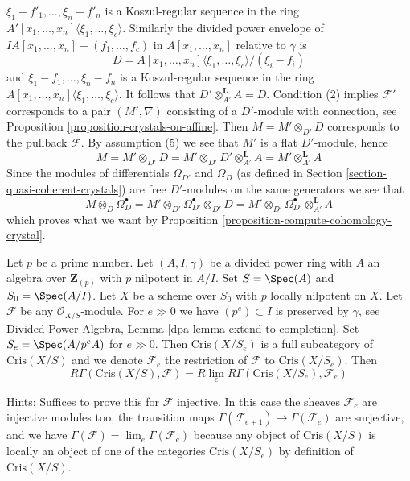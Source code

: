 \begin{remark}
$\xi_1 - f'_1, \ldots, \xi_n - f'_n$ is a Koszul-regular sequence in the
ring $A'[x_1, \ldots, x_n]\langle \xi_1, \ldots, \xi_c\rangle$.
Similarly the divided power envelope of
$IA[x_1, \ldots, x_n] + (f_1, \ldots, f_c)$ in $A[x_1, \ldots, x_n]$
relative to $\gamma$ is
$$
D = A[x_1, \ldots, x_n]\langle \xi_1, \ldots, \xi_c\rangle/(\xi_i - f_i)
$$
and $\xi_1 - f_1, \ldots, \xi_n - f_n$ is a Koszul-regular sequence in the
ring $A[x_1, \ldots, x_n]\langle \xi_1, \ldots, \xi_c\rangle$.
It follows that $D' \otimes_{A'}^\mathbf{L} A = D$. Condition (2)
implies $\mathcal{F}'$ corresponds to a pair $(M', \nabla)$
consisting of a $D'$-module with connection, see
Proposition \ref{proposition-crystals-on-affine}.
Then $M = M' \otimes_{D'} D$ corresponds to the pullback $\mathcal{F}$.
By assumption (5) we see that $M'$ is a flat $D'$-module, hence
$$
M = M' \otimes_{D'} D = M' \otimes_{D'} D' \otimes_{A'}^\mathbf{L} A
= M' \otimes_{A'}^\mathbf{L} A
$$
Since the modules of differentials $\Omega_{D'}$ and $\Omega_D$
(as defined in Section \ref{section-quasi-coherent-crystals})
are free $D'$-modules on the same generators we see that
$$
M \otimes_D \Omega^\bullet_D =
M' \otimes_{D'} \Omega^\bullet_{D'} \otimes_{D'} D =
M' \otimes_{D'} \Omega^\bullet_{D'} \otimes_{A'}^\mathbf{L} A
$$
which proves what we want by
Proposition \ref{proposition-compute-cohomology-crystal}.
\end{remark}

\begin{remark}[Rlim]
\label{remark-rlim}
Let $p$ be a prime number. Let $(A, I, \gamma)$ be a divided power
ring with $A$ an algebra over $\mathbf{Z}_{(p)}$ with $p$ nilpotent
in $A/I$. Set $S = \Spec(A)$ and $S_0 = \Spec(A/I)$.
Let $X$ be a scheme over $S_0$ with $p$ locally
nilpotent on $X$. Let $\mathcal{F}$ be any
$\mathcal{O}_{X/S}$-module. For $e \gg 0$ we have $(p^e) \subset I$
is preserved by $\gamma$, see
Divided Power Algebra, Lemma \ref{dpa-lemma-extend-to-completion}.
Set $S_e = \Spec(A/p^eA)$ for $e \gg 0$.
Then $\text{Cris}(X/S_e)$ is a full subcategory of $\text{Cris}(X/S)$
and we denote $\mathcal{F}_e$ the restriction of $\mathcal{F}$ to
$\text{Cris}(X/S_e)$. Then
$$
R\Gamma(\text{Cris}(X/S), \mathcal{F}) =
R\lim_e R\Gamma(\text{Cris}(X/S_e), \mathcal{F}_e)
$$

\medskip\noindent
Hints: Suffices to prove this for $\mathcal{F}$ injective.
In this case the sheaves $\mathcal{F}_e$ are injective
modules too, the transition maps
$\Gamma(\mathcal{F}_{e + 1}) \to \Gamma(\mathcal{F}_e)$ are
surjective, and we have
$\Gamma(\mathcal{F}) = \lim_e \Gamma(\mathcal{F}_e)$ because
any object of $\text{Cris}(X/S)$ is locally an object of one
of the categories $\text{Cris}(X/S_e)$ by definition of
$\text{Cris}(X/S)$.
\end{remark}

